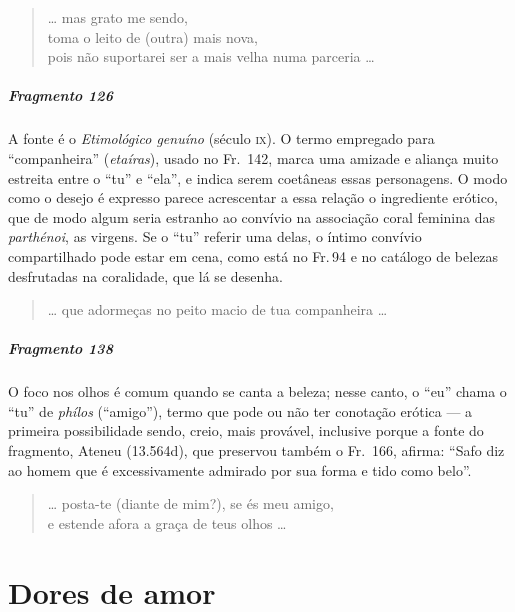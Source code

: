 \begin{verse}
\ldots{} mas grato me sendo,\\
toma o leito de (outra) mais nova, \\
pois não suportarei ser a mais velha numa parceria \ldots{}
\end{verse}


\paragraph{Fragmento 126}

{\small A fonte é o \textit{Etimológico genuíno }(século \textsc{ix}). O termo empregado para
“companheira” (\textit{etaíras}), usado no Fr.~142, marca uma amizade e aliança muito estreita entre o “tu”
e “ela”, e indica serem coetâneas essas personagens. O modo como o desejo é expresso parece acrescentar a essa relação o
ingrediente erótico, que de modo algum seria estranho ao convívio na associação coral feminina das \textit{parthénoi}, as virgens. Se o ``tu'' referir uma delas, o íntimo convívio compartilhado pode estar em cena, como está no Fr.\,94 e no catálogo de belezas desfrutadas na coralidade, que lá se desenha.}

\begin{verse}
\ldots{} que adormeças no peito macio de tua companheira \ldots{} 
\end{verse}


\paragraph{Fragmento 138}

{\small O foco nos olhos é comum quando se canta a beleza; nesse canto, o “eu” chama o
“tu” de \textit{phílos }(``amigo”), termo que pode ou não ter conotação
erótica --- a primeira possibilidade sendo, creio, mais provável, inclusive
porque a fonte do fragmento, Ateneu (13.564d), que preservou também o Fr.~166, afirma:
``Safo diz ao homem que é excessivamente admirado por sua forma e tido como belo''.}

\begin{verse}
\ldots{} posta-te (diante de mim?), se és meu amigo,\\
e estende afora a graça de teus olhos \ldots{}
\end{verse}


\chapter{Dores de amor}



